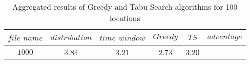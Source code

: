 \begin{table}[t]
\centering
\caption{
Aggregated results of Greedy and Tabu Search algorithms for 100 locations
}
\begin{tabular*}{0.8\linewidth}{@{\extracolsep{\fill}}cccccc}
\toprule
$file$ $name$ & $distribution$ & $time$ $window$ & $Greedy$ & $TS$ & $adventage$ \\ \midrule
\phantom{0}$1000$ & 3.84 & 3.21 & 2.73 & 3.20 \\
\end{tabular*}\end{table}
